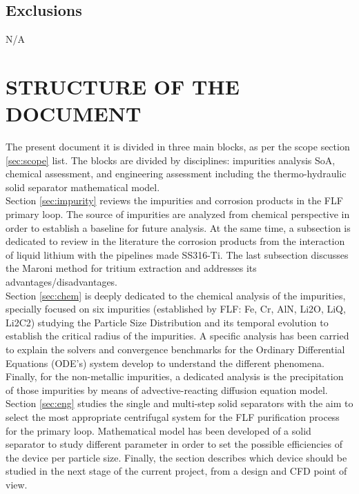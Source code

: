 \subsection{Exclusions} 
N/A
\newpage
\section{STRUCTURE OF THE DOCUMENT} %

The present document it is divided in three main blocks, as per the scope section \ref{sec:scope} list. The blocks are divided by disciplines: impurities analysis SoA, chemical assessment, and engineering assessment including the thermo-hydraulic solid separator mathematical model. \\

\noindent Section \ref{sec:impurity} reviews the impurities and corrosion products in the FLF primary loop. The source of impurities are analyzed from chemical perspective in order to establish a baseline for future analysis. At the same time, a subsection is dedicated to review in the literature the corrosion products from the interaction of liquid lithium with the pipelines made SS316-Ti. The last subsection discusses the Maroni method for tritium extraction and addresses its advantages/disadvantages. \\

\noindent Section \ref{sec:chem} is deeply dedicated to the chemical analysis of the impurities, specially focused on six impurities (established by FLF: Fe, Cr, AlN, Li2O, LiQ, Li2C2) studying the Particle Size Distribution and its temporal evolution to establish the critical radius of the impurities. A specific analysis has been carried to explain the solvers and convergence benchmarks for the Ordinary Differential Equations (ODE's) system develop to understand the different phenomena. Finally, for the non-metallic impurities, a dedicated analysis is the precipitation of those impurities by means of advective-reacting diffusion equation model.  \\

\noindent Section \ref{sec:eng} studies the single and multi-step solid separators with the aim to select the most appropriate centrifugal system for the FLF purification process for the primary loop. Mathematical model has been developed of a solid separator to study different parameter in order to set the possible efficiencies of the device per particle size. Finally, the section describes which device should be studied in the next stage of the current project, from a design and CFD point of view. 

